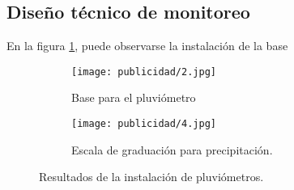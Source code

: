 \subsection{Diseño técnico de monitoreo}




En la figura \ref{publicidad2}, puede observarse la instalación de la base

\begin{figure}[h!]
	\centering
	\begin{subfigure} 
		\centering
		\texttt{[image: publicidad/2.jpg]}
		\caption{Base para el pluviómetro}
		\label{publicidad2}
	\end{subfigure} 
	\begin{subfigure} 
		\centering
		\texttt{[image: publicidad/4.jpg]}
		\caption{Escala de graduación para precipitación.}
		\label{publicidad4}
	\end{subfigure}
	\caption{Resultados de la instalación de pluviómetros.}
	\label{publicidad24-}
\end{figure}


